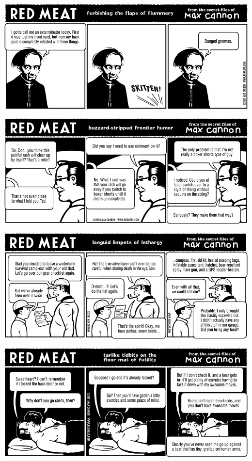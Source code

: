 \documentclass[a4paper,twoside,11pt]{article}
\begin{document}
\includegraphics[width=\textwidth]{redmeat_2011-01-11.png}



\includegraphics[width=\textwidth]{redmeat_2011-01-18.png}



\includegraphics[width=\textwidth]{redmeat_2011-01-25.png}



\includegraphics[width=\textwidth]{redmeat_2011-02-01.png}
\end{document}
